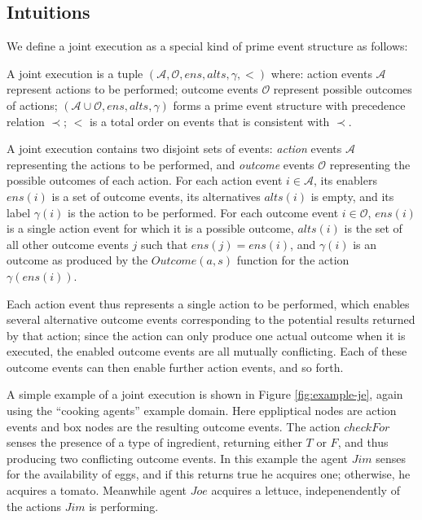 \subsection{Intuitions}

We define a joint execution as a special kind of prime event structure
as follows:

\begin{defnL}
 A joint execution is a tuple $(\mathcal{A},\mathcal{O},ens,alts,\gamma,<)$
where: action events $\mathcal{A}$ represent actions to be performed;
outcome events $\mathcal{O}$ represent possible outcomes of actions;
$(\mathcal{A}\cup\mathcal{O},ens,alts,\gamma)$ forms a prime event
structure with precedence relation $\prec$; $<$ is a total order
on events that is consistent with $\prec$. 
\end{defnL}
A joint execution contains two disjoint sets of events: \emph{action}
events $\mathcal{A}$ representing the actions to be performed, and
\emph{outcome} events $\mathcal{O}$ representing the possible outcomes
of each action. For each action event $i\in\mathcal{A}$, its enablers
$ens(i)$ is a set of outcome events, its alternatives $alts(i)$
is empty, and its label $\gamma(i)$ is the action to be performed.
For each outcome event $i\in\mathcal{O}$, $ens(i)$ is a single action
event for which it is a possible outcome, $alts(i)$ is the set of
all other outcome events $j$ such that $ens(j)=ens(i)$, and $\gamma(i)$
is an outcome as produced by the $Outcome(a,s)$ function for the
action $\gamma(ens(i))$.

Each action event thus represents a single action to be performed,
which enables several alternative outcome events corresponding to
the potential results returned by that action; since the action can
only produce one actual outcome when it is executed, the enabled outcome
events are all mutually conflicting. Each of these outcome events
can then enable further action events, and so forth.

A simple example of a joint execution is shown in Figure \ref{fig:example-je},
again using the {}``cooking agents'' example domain. Here eppliptical
nodes are action events and box nodes are the resulting outcome events.
The action $checkFor$ senses the presence of a type of ingredient,
returning either $T$ or $F$, and thus producing two conflicting
outcome events. In this example the agent $Jim$ senses for the availability
of eggs, and if this returns true he acquires one; otherwise, he acquires
a tomato. Meanwhile agent $Joe$ acquires a lettuce, indepenendently
of the actions $Jim$ is performing.

